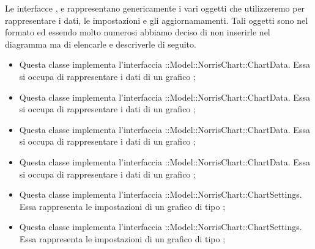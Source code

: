 	Le interfacce ,  e  rappresentano genericamente i vari oggetti che utilizzeremo per rappresentare i dati, le impostazioni e gli aggiornamamenti. Tali oggetti sono nel formato  ed essendo molto numerosi abbiamo deciso di non inserirle nel diagramma ma di elencarle e descriverle di seguito.

	\begin{itemize}
		\item {} Questa classe implementa l'interfaccia \linebreak {}::Model::NorrisChart::ChartData. Essa si occupa di rappresentare i dati di un grafico ;

		\item {} Questa classe implementa l'interfaccia \linebreak {}::Model::NorrisChart::ChartData. Essa si occupa di rappresentare i dati di un grafico ;

		\item {} Questa classe implementa l'interfaccia \linebreak {}::Model::NorrisChart::ChartData. Essa si occupa di rappresentare i dati di un grafico ;

		\item {} Questa classe implementa l'interfaccia \linebreak {}::Model::NorrisChart::ChartData. Essa si occupa di rappresentare i dati di un grafico ;

		\item {} Questa classe implementa l'interfaccia \linebreak {}::Model::NorrisChart::ChartSettings. Essa rappresenta le impostazioni di un grafico di tipo ;

		\item {} Questa classe implementa l'interfaccia \linebreak {}::Model::NorrisChart::ChartSettings. Essa rappresenta le impostazioni di un grafico di tipo ;


\end{itemize}
